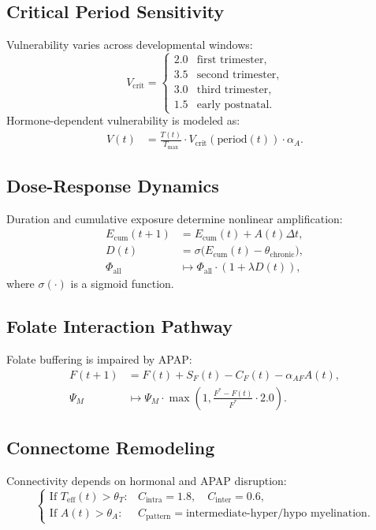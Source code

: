 \documentclass[12pt]{article}
\begin{document}
\subsection{Critical Period Sensitivity}
Vulnerability varies across developmental windows:
\[
V_{\text{crit}} =
\begin{cases}
2.0 & \text{first trimester}, \\
3.5 & \text{second trimester}, \\
3.0 & \text{third trimester}, \\
1.5 & \text{early postnatal}.
\end{cases}
\]
Hormone-dependent vulnerability is modeled as:
\begin{align}
V(t) &= \frac{T(t)}{T_{\max}} \cdot V_{\text{crit}}(\text{period}(t)) \cdot \alpha_{A}.
\end{align}

\subsection{Dose-Response Dynamics}
Duration and cumulative exposure determine nonlinear amplification:
\begin{align}
E_{\text{cum}}(t+1) &= E_{\text{cum}}(t) + A(t) \Delta t, \\
D(t) &= \sigma\big(E_{\text{cum}}(t) - \theta_{\text{chronic}}\big), \\
\Phi_{\text{all}} &\mapsto \Phi_{\text{all}} \cdot \left(1 + \lambda D(t)\right),
\end{align}
where $\sigma(\cdot)$ is a sigmoid function.

\subsection{Folate Interaction Pathway}
Folate buffering is impaired by APAP:
\begin{align}
F(t+1) &= F(t) + S_{F}(t) - C_{F}(t) - \alpha_{AF} A(t), \\
\Psi_{M} &\mapsto \Psi_{M} \cdot \max\!\left(1, \frac{F^{*} - F(t)}{F^{*}} \cdot 2.0\right).
\end{align}

\subsection{Connectome Remodeling}
Connectivity depends on hormonal and APAP disruption:
\[
\begin{cases}
\text{If } T_{\text{eff}}(t) > \theta_{T}: & 
    C_{\text{intra}} = 1.8,\quad C_{\text{inter}} = 0.6, \\
\text{If } A(t) > \theta_{A}: &
    C_{\text{pattern}} = \text{intermediate-hyper/hypo myelination}.
\end{cases}
\]
\end{document}

